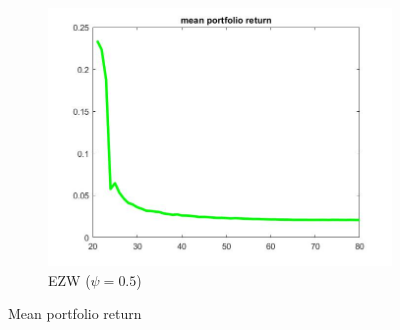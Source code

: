 \documentclass[12pt,a4paper]{article}
\begin{document}
\begin{figure}[h!]
\begin{subfigure}[b]{0.32\linewidth}
    \includegraphics[width=\linewidth]{graphs/Q4/mean_ret_ezw.jpg}
      \caption{EZW ($\psi = 0.5$)}
  \end{subfigure}
  \caption{Mean portfolio return}
    \label{fig:10}
\end{figure}


\clearpage
{}


\end{document}
